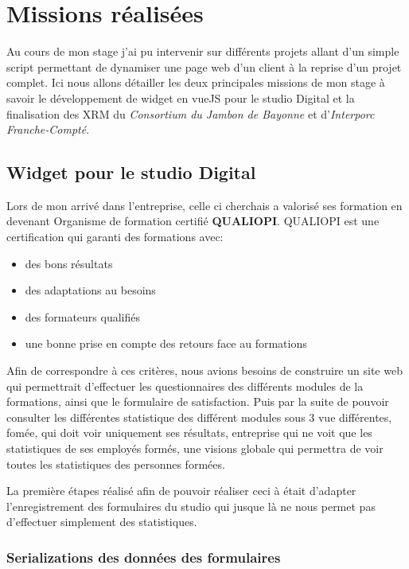\section{Missions réalisées}
Au cours de mon stage j'ai pu intervenir sur différents projets allant d'un simple script permettant de dynamiser une page web d'un client à la reprise d'un projet complet. Ici nous allons détailler les deux principales missions de mon stage à savoir le développement de widget en vueJS pour le studio Digital et la finalisation des XRM du \textit{Consortium du Jambon de Bayonne} et d'\textit{Interporc Franche-Compté}.

\subsection{Widget pour le studio Digital}
Lors de mon arrivé dans l'entreprise, celle ci cherchais a valorisé ses formation en devenant Organisme de formation certifié \textbf{QUALIOPI}. QUALIOPI est une certification qui garanti des formations avec: 
\begin{itemize}
    \item des bons résultats
    \item des adaptations au besoins
    \item des formateurs qualifiés
    \item une bonne prise en compte des retours face au formations
\end{itemize} 
Afin de correspondre à ces critères, nous avions besoins de construire un site web qui permettrait d'effectuer les questionnaires des différents modules de la formations, ainsi que le formulaire de satisfaction. Puis par la suite de pouvoir consulter les différentes statistique des différent modules sous 3 vue différentes, fomée, qui doit voir uniquement ses résultats, entreprise qui ne voit que les statistiques de ses employés formés, une visions globale qui permettra de voir toutes les statistiques des personnes formées.

La première étapes réalisé afin de pouvoir réaliser ceci à était d'adapter l'enregistrement des formulaires du studio qui jusque là ne nous permet pas d'effectuer simplement des statistiques. 

\subsubsection{Serializations des données des formulaires}